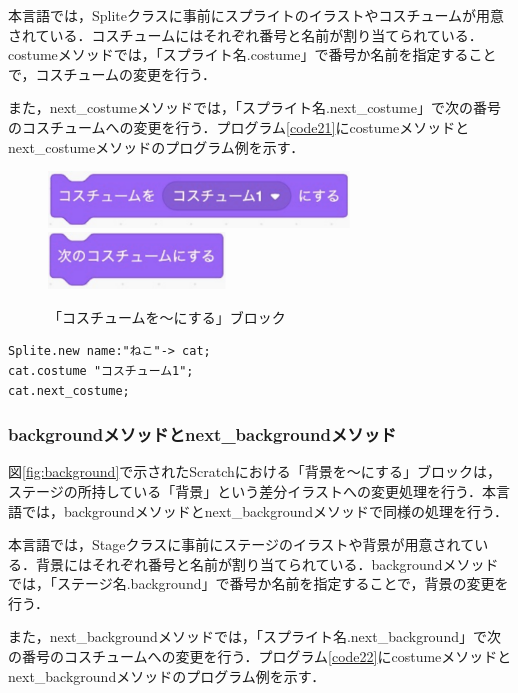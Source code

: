 \documentclass[10pt,a4j]{ltjsarticle}
\begin{document}
本言語では，Spliteクラスに事前にスプライトのイラストやコスチュームが用意されている．コスチュームにはそれぞれ番号と名前が割り当てられている．costumeメソッドでは，「スプライト名.costume」で番号か名前を指定することで，コスチュームの変更を行う．

また，next\_costumeメソッドでは，「スプライト名.next\_costume」で次の番号のコスチュームへの変更を行う．プログラム\ref{code21}にcostumeメソッドとnext\_costumeメソッドのプログラム例を示す．

\begin{figure}[H]
  \centering
  \includegraphics[height=15mm]{images/wear.pdf} \\
  \includegraphics[height=15mm]{images/next_wear.pdf} 
  \caption{「コスチュームを〜にする」ブロック}
  \label{fig:costume}
\end{figure}

\begin{lstlisting}[caption=costumeメソッドとnext\_costumeメソッドのプログラム例, label=code21]
Splite.new name:"ねこ"-> cat;
cat.costume "コスチューム1";
cat.next_costume;
\end{lstlisting}

\subsubsection{backgroundメソッドとnext\_backgroundメソッド}
図\ref{fig:background}で示されたScratchにおける「背景を〜にする」ブロックは，ステージの所持している「背景」という差分イラストへの変更処理を行う．本言語では，backgroundメソッドとnext\_backgroundメソッドで同様の処理を行う．

本言語では，Stageクラスに事前にステージのイラストや背景が用意されている．背景にはそれぞれ番号と名前が割り当てられている．backgroundメソッドでは，「ステージ名.background」で番号か名前を指定することで，背景の変更を行う．

また，next\_backgroundメソッドでは，「スプライト名.next\_background」で次の番号のコスチュームへの変更を行う．プログラム\ref{code22}にcostumeメソッドとnext\_backgroundメソッドのプログラム例を示す．
\end{document}
